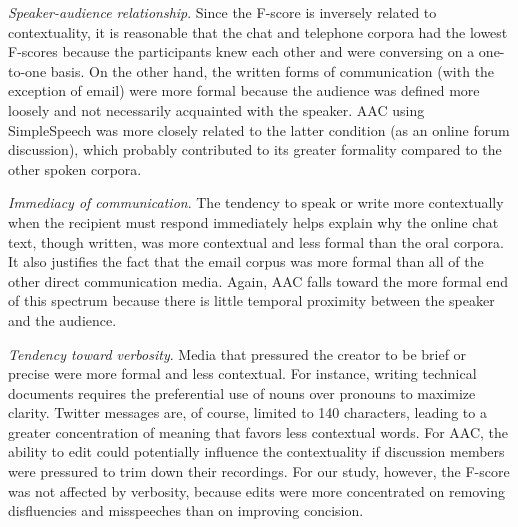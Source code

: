 \emph{Speaker-audience relationship}. 
Since the F-score is inversely related to contextuality, it is reasonable that the chat and telephone corpora had the lowest F-scores because the participants knew each other and were conversing on a one-to-one basis. 
On the other hand, the written forms of communication (with the exception of email) were more formal because the audience was defined more loosely and not necessarily acquainted with the speaker.
AAC using SimpleSpeech was more closely related to the latter condition (as an online forum discussion), which probably contributed to its greater formality compared to the other spoken corpora.

\emph{Immediacy of communication}. 
The tendency to speak or write more contextually when the recipient must respond immediately helps explain why the online chat text, though written, was more contextual and less formal than the oral corpora. 
It also justifies the fact that the email corpus was more formal than all of the other direct communication media.
Again, AAC falls toward the more formal end of this spectrum because there is little temporal proximity between the speaker and the audience.

\emph{Tendency toward verbosity}.
Media that pressured the creator to be brief or precise were more formal and less contextual.
For instance, writing technical documents requires the preferential use of nouns over pronouns to maximize clarity.
Twitter messages are, of course, limited to 140 characters, leading to a greater concentration of meaning that favors less contextual words.
For AAC, the ability to edit could potentially influence the contextuality if discussion members were pressured to trim down their recordings. 
For our study, however, the F-score was not affected by verbosity, because edits were more concentrated on removing disfluencies and misspeeches than on improving concision.